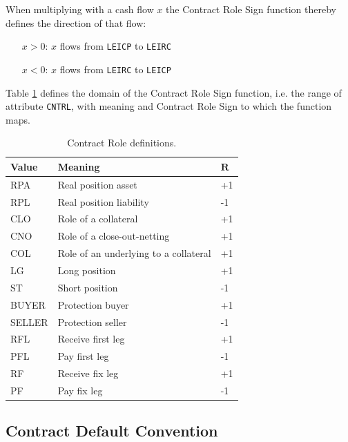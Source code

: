 \documentclass[9pt,oneside]{amsart}
\newcommand{\attr}[1]{\texttt{#1}}
\begin{document}
\begin{multicols}{2}
When multiplying with a cash flow $x$ the Contract Role Sign function thereby defines the direction of that flow:

\begin{itemize}
	\item[$x>0$:] $x$ flows from \attr{LEICP} to \attr{LEIRC}
	
	\item[$x<0$:] $x$ flows from \attr{LEIRC} to \attr{LEICP}
\end{itemize}

Table \ref{tbl:cntrl} defines the domain of the Contract Role Sign function, i.e. the range of attribute \attr{CNTRL}, with meaning and Contract Role Sign to which the function maps.




\begin{table}[H]
	\centering
	\begin{tabular}{| p{0.5in}p{1.5in}p{0.2in} |}
	\hline
	\textbf{Value} & \textbf{Meaning} & $\textbf{R}$ \\
	\hline
	RPA & Real position asset & +1 \\
	\hline
	RPL & Real position liability & -1 \\
	\hline
	CLO & Role of a collateral & +1 \\
	\hline
	CNO & Role of a close-out-netting & +1 \\
	\hline
	COL & Role of an underlying to a collateral & +1 \\
	\hline
	LG & Long position & +1 \\
	\hline
	ST & Short position & -1 \\
	\hline
	BUYER & Protection buyer & +1 \\
	\hline
	SELLER & Protection seller & -1 \\
	\hline
	RFL & Receive first leg & +1 \\
	\hline
	PFL & Pay first leg & -1 \\
	\hline
	RF & Receive fix leg & +1 \\
	\hline
	PF & Pay fix leg & -1 \\
	\hline
	\end{tabular}
	\caption{Contract Role definitions.}
	\label{tbl:cntrl}
\end{table}




\subsection{Contract Default Convention}


\end{multicols}
\end{document}
